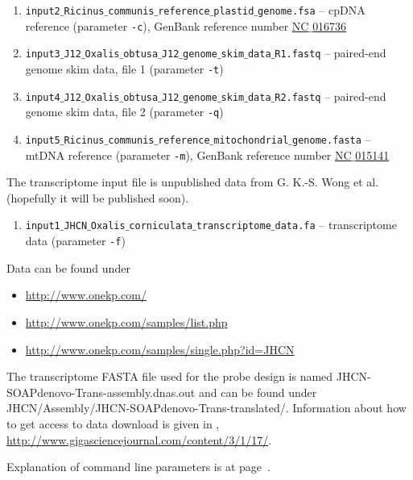 \documentclass[a4paper, 11pt, twoside]{article}
\begin{document}
\begin{enumerate}
  \item \texttt{input2$\_$Ricinus$\_$communis$\_$reference$\_$plastid$\_$genome.fsa} -- cpDNA reference (parameter \texttt{-c}), GenBank reference number \href{http://www.ncbi.nlm.nih.gov/nuccore/372450118/}{NC$\_$016736}
  \item \texttt{input3$\_$J12$\_$Oxalis$\_$obtusa$\_$J12$\_$genome$\_$skim$\_$data$\_$R1.fastq} -- paired-end genome skim data, file 1 (parameter \texttt{-t})
  \item \texttt{input4$\_$J12$\_$Oxalis$\_$obtusa$\_$J12$\_$genome$\_$skim$\_$data$\_$R2.fastq} -- paired-end genome skim data, file 2 (parameter \texttt{-q})
  \item \texttt{input5$\_$Ricinus$\_$communis$\_$reference$\_$mitochondrial$\_$genome.fasta} -- mtDNA reference (parameter \texttt{-m}), GenBank reference number \href{http://www.ncbi.nlm.nih.gov/nuccore/323649872/}{NC$\_$015141}
\end{enumerate}

The transcriptome input file is unpublished data from G. K.-S. Wong et al. (hopefully it will be published soon).

\begin{enumerate}
 \item \texttt{input1$\_$JHCN$\_$Oxalis$\_$corniculata$\_$transcriptome$\_$data.fa} -- transcriptome data (parameter \texttt{-f})
\end{enumerate}

Data can be found under

\begin{itemize}
  \item \href{http://www.onekp.com/}{http://www.onekp.com/}
  \item \href{http://www.onekp.com/samples/list.php}{http://www.onekp.com/samples/list.php}
  \item \href{http://www.onekp.com/samples/single.php?id=JHCN}{http://www.onekp.com/samples/single.php?id=JHCN}
\end{itemize}

The transcriptome FASTA file used for the probe design is named JHCN-SOAPdenovo-Trans-assembly.dnas.out and can be found under JHCN/Assembly/JHCN-SOAPdenovo-Trans-translated/. Information about how to get access to data download is given in \citet{Matasci2014}, \href{http://www.gigasciencejournal.com/content/3/1/17/}{http://www.gigasciencejournal.com/content/3/1/17/}.

Explanation of command line parameters is at page~\pageref{script-usage}.
\end{document}
